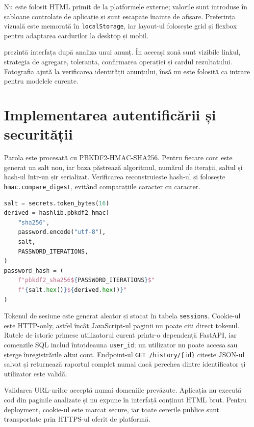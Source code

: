 Nu este folosit HTML primit de la platformele externe; valorile sunt introduse în șabloane controlate de aplicație și sunt escapate înainte de afișare. Preferința vizuală este memorată în \texttt{localStorage}, iar layout-ul folosește grid și flexbox pentru adaptarea cardurilor la desktop și mobil.

 prezintă interfața după analiza unui anunț. În aceeași zonă sunt vizibile linkul, strategia de agregare, toleranța, confirmarea operației și cardul rezultatului. Fotografia ajută la verificarea identității anunțului, însă nu este folosită ca intrare pentru modelele curente.


\section{Implementarea autentificării și securității}
\label{sec:implementation-security}

Parola este procesată cu PBKDF2-HMAC-SHA256. Pentru fiecare cont este generat un salt nou, iar baza păstrează algoritmul, numărul de iterații, saltul și hash-ul într-un șir serializat. Verificarea reconstruiește hash-ul și folosește \texttt{hmac.compare\_digest}, evitând comparațiile caracter cu caracter.

\begin{lstlisting}[language=Python,caption={Principiul de derivare sigură a parolei},label={lst:password-hash}]
salt = secrets.token_bytes(16)
derived = hashlib.pbkdf2_hmac(
    "sha256",
    password.encode("utf-8"),
    salt,
    PASSWORD_ITERATIONS,
)
password_hash = (
    f"pbkdf2_sha256${PASSWORD_ITERATIONS}$"
    f"{salt.hex()}${derived.hex()}"
)
\end{lstlisting}

Tokenul de sesiune este generat aleator și stocat în tabela \texttt{sessions}. Cookie-ul este HTTP-only, astfel încât JavaScript-ul paginii nu poate citi direct tokenul. Rutele de istoric primesc utilizatorul curent printr-o dependență FastAPI, iar comenzile SQL includ întotdeauna \texttt{user\_id}; un utilizator nu poate accesa sau șterge înregistrările altui cont. Endpoint-ul \texttt{GET /history/\{id\}} citește JSON-ul salvat și returnează raportul complet numai dacă perechea dintre identificator și utilizator este validă.

Validarea URL-urilor acceptă numai domeniile prevăzute. Aplicația nu execută cod din paginile analizate și nu expune în interfață conținut HTML brut. Pentru deployment, cookie-ul este marcat secure, iar toate cererile publice sunt transportate prin HTTPS-ul oferit de platformă.

